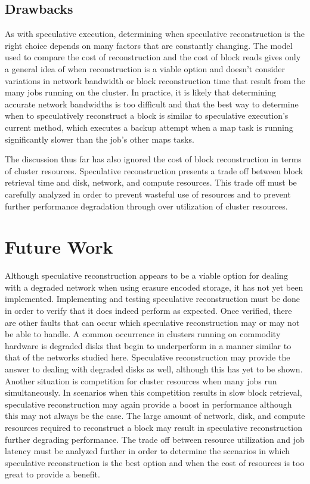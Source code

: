 \documentclass{ucetd}
\begin{document}
\section{Drawbacks}

As with speculative execution, determining when speculative reconstruction is
the right choice depends on many factors that are constantly changing. The model
used to compare the cost of reconstruction and the cost of block reads gives
only a general idea of when reconstruction is a viable option and doesn't
consider variations in network bandwidth or block reconstruction time that result
from the many jobs running on the cluster. In practice, it is likely that
determining accurate network bandwidths is too difficult and that the best way
to determine when to speculatively reconstruct a block is similar to
speculative execution's current method, which executes a backup attempt when a
map task is running significantly slower than the job's other maps tasks.

The discussion thus far has also ignored the cost of block reconstruction in
terms of cluster resources.  Speculative reconstruction presents a trade off
between block retrieval time and disk, network, and compute resources.  This
trade off must be carefully analyzed in order to prevent wasteful use of
resources and to prevent further performance degradation through over
utilization of cluster resources.


\chapter{Future Work}

Although speculative reconstruction appears to be a viable option for dealing
with a degraded network when using erasure encoded storage, it has not yet been
implemented. Implementing and testing speculative reconstruction must be done in
order to verify that it does indeed perform as expected. Once verified, there
are other faults that can occur which speculative reconstruction may or may not
be able to handle. A common occurrence in clusters running on commodity hardware
is degraded disks that begin to underperform in a manner similar to that of the
networks studied here. Speculative reconstruction may provide the answer to
dealing with degraded disks as well, although this has yet to be shown. Another
situation is competition for cluster resources when many jobs run
simultaneously. In scenarios when this competition results in slow block
retrieval, speculative reconstruction may again provide a boost in performance
although this may not always be the case. The large amount of network, disk, and
compute resources required to reconstruct a block may result in speculative
reconstruction further degrading performance. The trade off between resource
utilization and job latency must be analyzed further in order to determine the
scenarios in which speculative reconstruction is the best option and when the
cost of resources is too great to provide a benefit.
\end{document}
